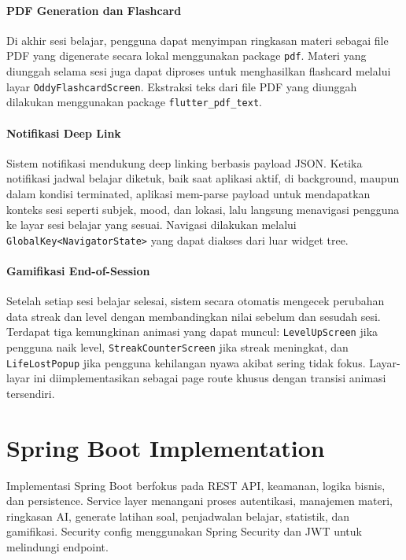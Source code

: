 \documentclass[11pt]{article}
\begin{document}
\paragraph{PDF Generation dan Flashcard}

Di akhir sesi belajar, pengguna dapat menyimpan ringkasan materi sebagai file PDF yang digenerate secara lokal menggunakan package \texttt{pdf}. Materi yang diunggah selama sesi juga dapat diproses untuk menghasilkan flashcard melalui layar \texttt{OddyFlashcardScreen}\linebreak[1]. Ekstraksi teks dari file PDF yang diunggah dilakukan menggunakan package \texttt{flutter\_pdf\_text}.

\paragraph{Notifikasi Deep Link}

Sistem notifikasi mendukung deep linking berbasis payload JSON. Ketika notifikasi jadwal belajar diketuk, baik saat aplikasi aktif, di background, maupun dalam kondisi terminated, aplikasi mem-parse payload untuk mendapatkan konteks sesi seperti subjek, mood, dan lokasi, lalu langsung menavigasi pengguna ke layar sesi belajar yang sesuai. Navigasi dilakukan melalui \texttt{GlobalKey<NavigatorState>} yang dapat diakses dari luar widget tree.

\paragraph{Gamifikasi End-of-Session}

Setelah setiap sesi belajar selesai, sistem secara otomatis mengecek perubahan data streak dan level dengan membandingkan nilai sebelum dan sesudah sesi. Terdapat tiga kemungkinan animasi yang dapat muncul: \texttt{LevelUpScreen} jika pengguna naik level, \texttt{StreakCounterScreen} jika streak meningkat, dan \texttt{LifeLostPopup} jika pengguna kehilangan nyawa akibat sering tidak fokus. Layar-layar ini diimplementasikan sebagai page route khusus dengan transisi animasi tersendiri.

\section{Spring Boot Implementation}

Implementasi Spring Boot berfokus pada REST API, keamanan, logika bisnis, dan persistence. Service layer menangani proses autentikasi, manajemen materi, ringkasan AI, generate latihan soal, penjadwalan belajar, statistik, dan gamifikasi. Security config menggunakan Spring Security dan JWT untuk melindungi endpoint.
\end{document}
